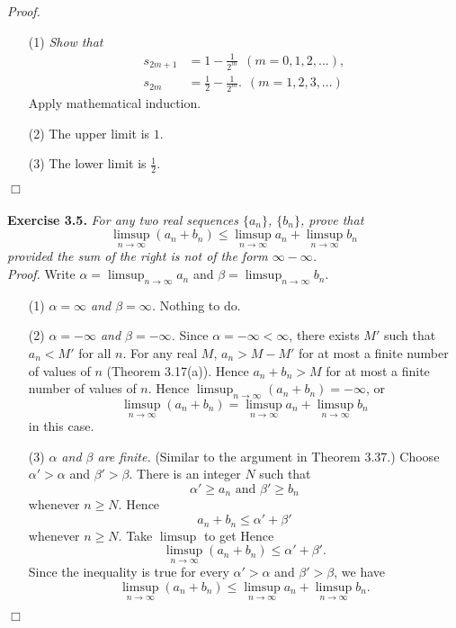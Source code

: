\documentclass{article}
\begin{document}
\emph{Proof.}
\begin{enumerate}
\item[(1)]
\emph{Show that
\begin{align*}
s_{2m+1} &= 1 - \frac{1}{2^m} \:\: (m = 0, 1, 2, ...), \\
s_{2m} &= \frac{1}{2} - \frac{1}{2^m}. \:\: (m = 1, 2, 3, ...)
\end{align*}}
Apply mathematical induction.
\item[(2)]
The upper limit is $1$.
\item[(3)]
The lower limit is $\frac{1}{2}$.
\end{enumerate}
$\Box$ \\\\






\textbf{Exercise 3.5.}
\emph{For any two real sequences $\{a_n\}$, $\{b_n\}$, prove that
$$\limsup_{n \to \infty} (a_n + b_n)
\leq \limsup_{n \to \infty} a_n + \limsup_{n \to \infty} b_n$$
provided the sum of the right is not of the form $\infty - \infty$.} \\

\emph{Proof.}
Write
$\alpha = \limsup_{n \to \infty} a_n$
and
$\beta = \limsup_{n \to \infty} b_n$.
\begin{enumerate}
\item[(1)]
\emph{$\alpha = \infty$ and $\beta = \infty$.}
Nothing to do.
\item[(2)]
\emph{$\alpha = -\infty$ and $\beta = -\infty$.}
Since $\alpha = -\infty < \infty$,
there exists $M'$ such that $a_n < M'$ for all $n$.
For any real $M$, $a_n > M - M'$ for at most a finite number of values of $n$
(Theorem 3.17(a)).
Hence $a_n + b_n > M$ for at most a finite number of values of $n$.
Hence $\limsup_{n \to \infty} (a_n + b_n) = -\infty$,
or
$$\limsup_{n \to \infty} (a_n + b_n)
= \limsup_{n \to \infty} a_n + \limsup_{n \to \infty} b_n$$
in this case.
\item[(3)]
\emph{$\alpha$ and $\beta$ are finite.}
(Similar to the argument in Theorem 3.37.)
Choose $\alpha' > \alpha$ and $\beta' > \beta$.
There is an integer $N$ such that
$$\alpha' \geq a_n \text{ and } \beta' \geq b_n$$
whenever $n \geq N$.
Hence $$a_n + b_n \leq \alpha' + \beta'$$
whenever $n \geq N$. Take $\limsup$ to get
Hence $$\limsup_{n \to \infty} (a_n + b_n) \leq \alpha' + \beta'.$$
Since the inequality is true for every $\alpha' > \alpha$ and $\beta' > \beta$,
we have
$$\limsup_{n \to \infty} (a_n + b_n)
\leq \limsup_{n \to \infty} a_n + \limsup_{n \to \infty} b_n.$$
\end{enumerate}
$\Box$ \\\\
\end{document}
